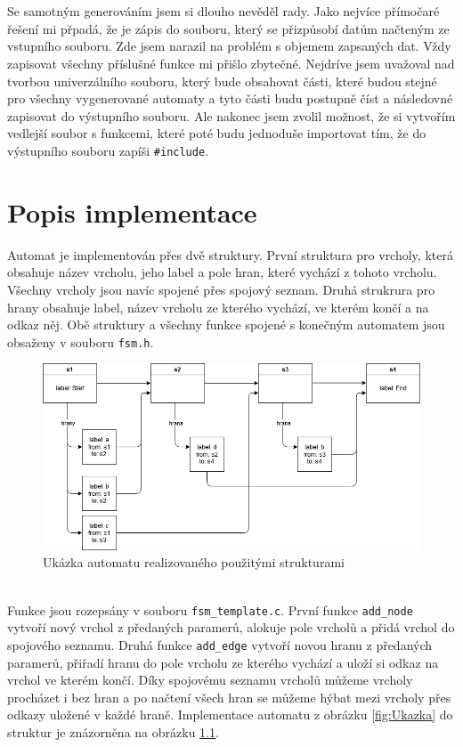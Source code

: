 \documentclass[czech,SP]{thesiskiv}
\begin{document}
\\ \\ 
{Se samotným generováním jsem si dlouho nevěděl rady. Jako nejvíce přímočaré řešení mi přpadá, že je zápis do souboru, který se přizpůsobí datům načteným ze vstupního souboru. Zde jsem narazil na problém s objemem zapsaných dat. Vždy zapisovat všechny příslušné funkce mi přišlo zbytečné. Nejdríve jsem uvažoval nad tvorbou univerzálního souboru, který bude obsahovat části, které budou stejné pro všechny vygenerované automaty a tyto části budu postupně číst a následovné zapisovat do výstupního souboru. Ale nakonec jsem zvolil možnost, že si vytvořím vedlejší soubor s funkcemi, které poté budu jednoduše importovat tím, že do výstupního souboru zapíši \texttt{\#include}. }

\chapter{Popis implementace }
{Automat je implementován přes dvě struktury. První struktura pro vrcholy, která obsahuje název vrcholu, jeho label a pole hran, které vychází z tohoto vrcholu. Všechny vrcholy jsou navíc spojené přes spojový seznam. Druhá strukrura pro hrany obsahuje label, název vrcholu ze kterého vychází, ve kterém končí a na odkaz něj. Obě struktury a všechny funkce spojené s konečným automatem jsou obsaženy v souboru \texttt{fsm.h}.} 
\\
\begin{figure}[!ht]
\centering
\includegraphics[width=\textwidth]{struct} 
\caption{Ukázka automatu realizovaného použitými strukturami}
\label{fig:Struktura}
\end{figure}
\\
{Funkce jsou rozepsány v souboru \texttt{fsm\_template.c}. První funkce \texttt{add\_node} vytvoří nový vrchol z předaných paramerů, alokuje pole vrcholů a přidá vrchol do spojového seznamu. Druhá funkce \texttt{add\_edge} vytvoří novou hranu z předaných paramerů, přiřadí hranu do pole vrcholu ze kterého vychází a uloží si odkaz na vrchol ve kterém končí. Díky spojovému seznamu vrcholů můžeme vrcholy procházet i bez hran a po načtení všech hran se můžeme hýbat mezi vrcholy přes odkazy uložené v každé hraně. Implementace automatu z obrázku \ref{fig:Ukazka} do struktur je znázorněna na obrázku \ref{fig:Struktura}.} 
\end{document}
